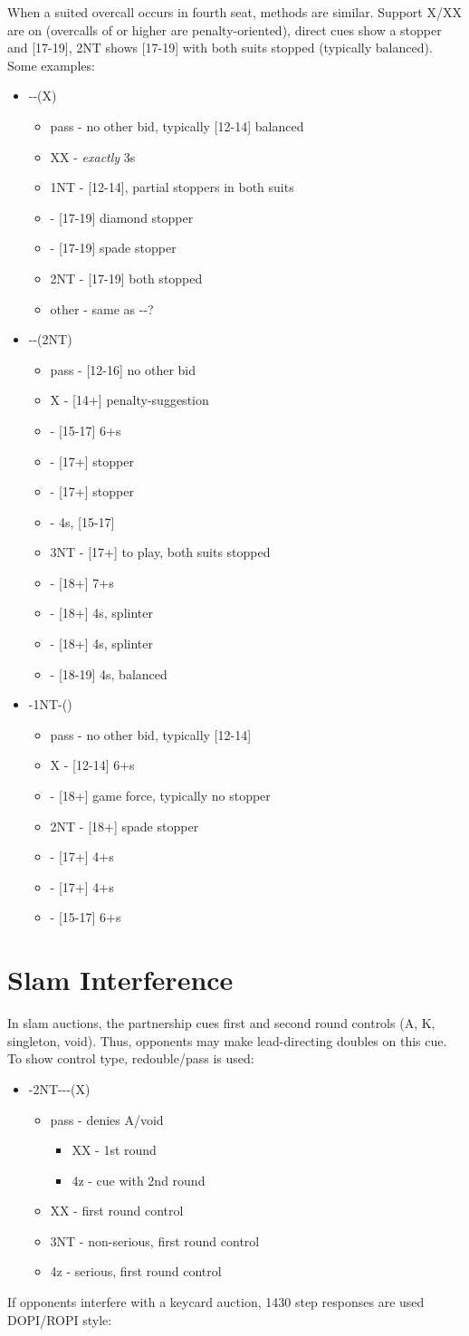 \documentclass[12pt]{report}
\newcommand{\q}[1]{\multido{}{#1}{\qquad}}
\newcommand{\ul}[1]{\begin{itemize}#1\end{itemize}}
\newcommand{\li}[1]{\item[~] \q{#1}}
\begin{document}
    When a suited overcall occurs in fourth seat, methods are similar.  Support X/XX are on (overcalls of  or higher are penalty-oriented), direct cues show a stopper and [17-19], 2NT shows [17-19] with both suits stopped (typically balanced).  Some examples:

    \ul {
        \li0 --(X)
        \ul {
            \li0 pass - no other bid, typically [12-14] balanced
            \li0 XX - \textit{exactly} 3\he{}s
            \li0 1NT - [12-14], partial stoppers in both suits
            \li0 \di2 - [17-19] diamond stopper
            \li0 \sp2 - [17-19] spade stopper
            \li0 2NT - [17-19] both stopped
            \li0 other - same as \cl1-\he1-?
        }
        \li0 \cl1-\sp1-(2NT)
        \ul {
            \li0 pass - [12-16] no other bid
            \li0 X - [14+] penalty-suggestion
            \li0 \cl3 - [15-17] 6+\cl{}s
            \li0 \di3 - [17+] stopper
            \li0 \he3 - [17+] stopper
            \li0 \sp3 - 4\sp{}s, [15-17]
            \li0 3NT - [17+] to play, both suits stopped
            \li0 \cl4 - [18+] 7+\cl{}s
            \li0 \di4 - [18+] 4\sp{}s, splinter
            \li0 \di4 - [18+] 4\he{}s, splinter
            \li0 \sp4 - [18-19] 4\sp{}s, balanced
        }
        \li0 \he1-1NT-(\he2)
        \ul {
            \li0 pass - no other bid, typically [12-14]
            \li0 X - [12-14] 6+\he{}s
            \li0 \sp2 - [18+] game force, typically no stopper
            \li0 2NT - [18+] spade stopper
            \li0 \cl3 - [17+] 4+\cl{}s
            \li0 \di3 - [17+] 4+\di{}s
            \li0 \he3 - [15-17] 6+\he{}s
        }
    }
\section{Slam Interference} \label{3:7}

    In slam auctions, the partnership cues first and second round controls (A, K, singleton, void).  Thus, opponents may make lead-directing doubles on this cue.  To show control type, redouble/pass is used:

    \ul {
        \li0 -2NT---(X)
        \ul {
            \li0 pass - denies A/void
            \ul {
                \li0 XX - 1st round
                \li0 4z - cue with 2nd round
            }
            \li0 XX - first round control
            \li0 3NT - non-serious, first round control
            \li0 4z - serious, first round control
        }
    }

    If opponents interfere with a keycard auction, 1430 step responses are used DOPI/ROPI style:
\end{document}

